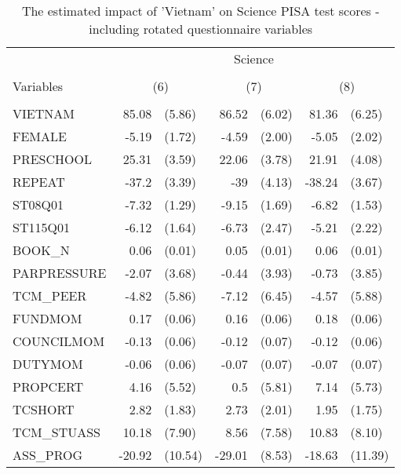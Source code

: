 \documentclass[10pt]{article}
\begin{document}
	\begin{table}[H]
		\small
		\def\arraystretch{0.7}
		\def\tabcolsep{14}
		\centering
		\captionsetup{justification=centering}
		\caption{The estimated impact of 'Vietnam' on Science PISA test scores - including rotated questionnaire variables}
		\begin{threeparttable}
			\begin{tabular}{lrlrlrl}
				\toprule
				\midrule
				& \multicolumn{6}{c}{Science} \\
				\cline{2-7} \\
				Variables & \multicolumn{2}{c}{(6)} & \multicolumn{2}{c}{(7)} & \multicolumn{2}{c}{(8)} \\
				\hline\\							
				VIETNAM & 85.08 & (5.86) & 86.52 & (6.02) & 81.36 & (6.25) \\[0.2em]
				FEMALE & -5.19 & (1.72) & -4.59 & (2.00) & -5.05 & (2.02) \\[0.2em]
				PRESCHOOL & 25.31 & (3.59) & 22.06 & (3.78) & 21.91 & (4.08) \\[0.2em]
				REPEAT & -37.2 & (3.39) & -39   & (4.13) & -38.24 & (3.67) \\[0.2em]
				ST08Q01 & -7.32 & (1.29) & -9.15 & (1.69) & -6.82 & (1.53) \\[0.2em]
				ST115Q01 & -6.12 & (1.64) & -6.73 & (2.47) & -5.21 & (2.22) \\[0.2em]
				BOOK\_N & 0.06  & (0.01) & 0.05  & (0.01) & 0.06  & (0.01) \\[0.2em]
				PARPRESSURE & -2.07 & (3.68) & -0.44 & (3.93) & -0.73 & (3.85) \\[0.2em]
				TCM\_PEER & -4.82 & (5.86) & -7.12 & (6.45) & -4.57 & (5.88) \\[0.2em]
				FUNDMOM & 0.17  & (0.06) & 0.16  & (0.06) & 0.18  & (0.06) \\[0.2em]
				COUNCILMOM & -0.13 & (0.06) & -0.12 & (0.07) & -0.12 & (0.06) \\[0.2em]
				DUTYMOM & -0.06 & (0.06) & -0.07 & (0.07) & -0.07 & (0.07) \\[0.2em]
				PROPCERT & 4.16  & (5.52) & 0.5   & (5.81) & 7.14  & (5.73) \\[0.2em]
				TCSHORT & 2.82  & (1.83) & 2.73  & (2.01) & 1.95  & (1.75) \\[0.2em]
				TCM\_STUASS & 10.18 & (7.90) & 8.56  & (7.58) & 10.83 & (8.10) \\[0.2em]
				ASS\_PROG & -20.92 & (10.54) & -29.01 & (8.53) & -18.63 & (11.39) \\[0.2em]

\end{tabular}
\end{threeparttable}
\end{table}
\end{document}
